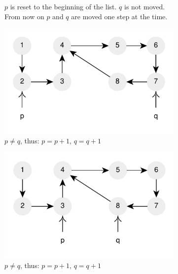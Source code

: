\begin{figure}
\begin{subfigure}[l]{0.36\textwidth}
		\caption{$p$ is reset to the beginning of the list. $q$ is not moved.  
		From now on $p$ and $q$ are moved one step at the time.}
		\label{fig:cycle_in_list:floyd7}
	 \end{subfigure}
	 \hfill
	 \begin{subfigure}[l]{0.36\textwidth}
		\includegraphics[width=1\linewidth]{sources/cycle_in_list/images/floyd8}
		\caption{$p \neq q$,  thus: $p=p+1$, $q=q+1$}
		\label{fig:cycle_in_list:floyd8}
	 \end{subfigure}
	 \hfill
	 \begin{subfigure}[l]{0.36\textwidth}
		\includegraphics[width=1\linewidth]{sources/cycle_in_list/images/floyd9}
		\caption{$p \neq q$,  thus: $p=p+1$, $q=q+1$}
		\label{fig:cycle_in_list:floyd9}
	 \end{subfigure}
	 \hfill
	 \begin{subfigure}[l]{0.36\textwidth}

\end{subfigure}
\end{figure}
